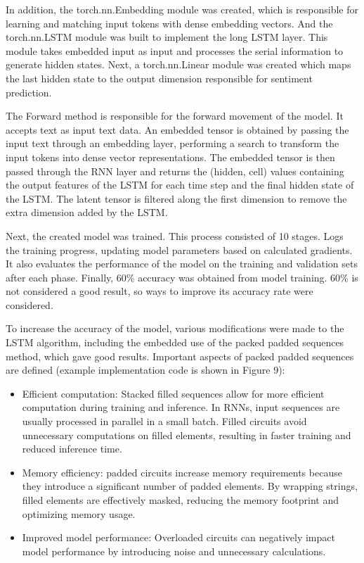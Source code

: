 In addition, the torch.nn.Embedding module was created, which is
responsible for learning and matching input tokens with dense embedding
vectors. And the torch.nn.LSTM module was built to implement the long
LSTM layer. This module takes embedded input as input and processes the
serial information to generate hidden states. Next, a torch.nn.Linear
module was created which maps the last hidden state to the output
dimension responsible for sentiment prediction.

The Forward method is responsible for the forward movement of the model.
It accepts text as input text data. An embedded tensor is obtained by
passing the input text through an embedding layer, performing a search
to transform the input tokens into dense vector representations. The
embedded tensor is then passed through the RNN layer and returns the
(hidden, cell) values containing the output features of the LSTM for
each time step and the final hidden state of the LSTM. The latent tensor
is filtered along the first dimension to remove the extra dimension
added by the LSTM.

Next, the created model was trained. This process consisted of 10
stages. Logs the training progress, updating model parameters based on
calculated gradients. It also evaluates the performance of the model on
the training and validation sets after each phase. Finally, 60\%
accuracy was obtained from model training. 60\% is not considered a good
result, so ways to improve its accuracy rate were considered.

To increase the accuracy of the model, various modifications were made
to the LSTM algorithm, including the embedded use of the packed padded
sequences method, which gave good results. Important aspects of packed
padded sequences are defined (example implementation code is shown in
Figure 9):

\begin{itemize}
\item
  Efficient computation: Stacked filled sequences allow for more
  efficient computation during training and inference. In RNNs, input
  sequences are usually processed in parallel in a small batch. Filled
  circuits avoid unnecessary computations on filled elements, resulting
  in faster training and reduced inference time.
\item
  Memory efficiency: padded circuits increase memory requirements
  because they introduce a significant number of padded elements. By
  wrapping strings, filled elements are effectively masked, reducing the
  memory footprint and optimizing memory usage.
\item
  Improved model performance: Overloaded circuits can negatively impact
  model performance by introducing noise and unnecessary calculations.
\end{itemize}

